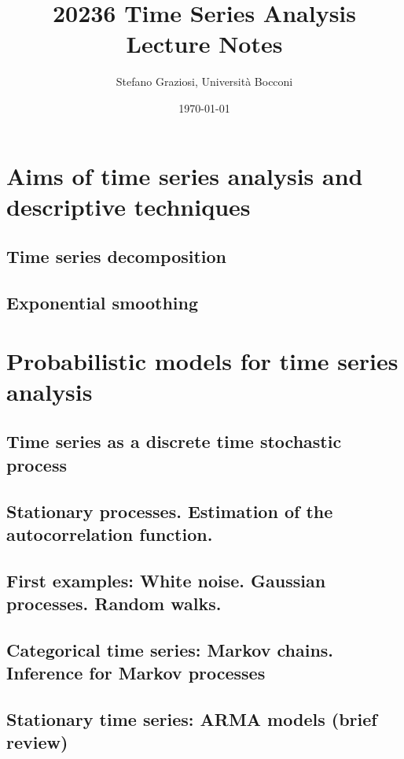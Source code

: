 \documentclass[usenames,dvipsnames,12pt]{book}
\title{20236 Time Series Analysis \\[1cm] \textbf{Lecture Notes}}
\author{Stefano Graziosi, Università Bocconi}
\date{\today}
\begin{document}
\maketitle

\tableofcontents



\part*{Aims of time series analysis and descriptive techniques}

    \chapter{Time series decomposition}

    \chapter{Exponential smoothing}

\part{Probabilistic models for time series analysis}

    \chapter{Time series as a discrete time stochastic process}

    \chapter[Stationary processes]{Stationary processes. Estimation of the autocorrelation function.}

    \chapter[White noise. Gaussian processes. Random walks.]{First examples: White noise. Gaussian processes. Random walks.}

    \chapter[Markov chains. Inference for Markov processes]{Categorical time series: Markov chains. Inference for Markov processes}

    \chapter[ARMA models]{Stationary time series: ARMA models (brief review)}
\end{document}

